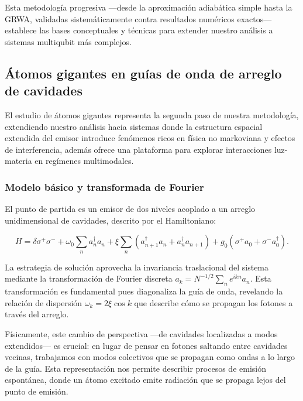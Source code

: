 \documentclass[onecolumn,notitlepage,letterpaper,aps,pra,12pt]{article}
\numberwithin{equation}{section}
\begin{document}
Esta metodología progresiva —desde la aproximación adiabática simple hasta la GRWA, validadas sistemáticamente contra resultados numéricos exactos— establece las bases conceptuales y técnicas para extender nuestro análisis a sistemas multiqubit más complejos.


\subsection{Átomos gigantes en guías de onda de arreglo de cavidades}

El estudio de átomos gigantes representa la segunda paso de nuestra metodología, extendiendo nuestro análisis hacia sistemas donde la estructura espacial extendida del emisor introduce fenómenos ricos en física no markoviana y efectos de interferencia, además ofrece una plataforma para explorar interacciones luz-materia en regímenes multimodales.

\subsubsection{Modelo básico y transformada de Fourier}

El punto de partida es un emisor de dos niveles acoplado a un arreglo unidimensional de cavidades, descrito por el Hamiltoniano:

\[H = \delta\sigma^{+}\sigma^{-} + \omega_{0}\sum_{n}a^{\dagger}_{n}a_{n} + \xi\sum_{n}\left(a^{\dagger}_{n+1}a_{n} + a^{\dagger}_{n}a_{n+1}\right) + g_{0}\left(\sigma^{+}a_{0} + \sigma^{-}a^{\dagger}_{0}\right).\]

La estrategia de solución aprovecha la invariancia traslacional del sistema mediante la transformación de Fourier discreta $a_{k} = N^{-1/2}\sum_{n}e^{ikn}a_{n}$. Esta transformación es fundamental pues diagonaliza la guía de onda, revelando la relación de dispersión $\omega_{k} = 2\xi\cos k$ que describe cómo se propagan los fotones a través del arreglo.

Físicamente, este cambio de perspectiva —de cavidades localizadas a modos extendidos— es crucial: en lugar de pensar en fotones saltando entre cavidades vecinas, trabajamos con modos colectivos que se propagan como ondas a lo largo de la guía. Esta representación nos permite describir procesos de emisión espontánea, donde un átomo excitado emite radiación que se propaga lejos del punto de emisión.
\end{document}
